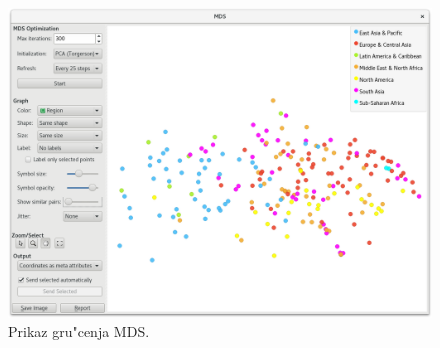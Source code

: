 \begin{figure}
\begin{center}
\includegraphics[width=12cm]{pic/clustering_mds.png}
\end{center}
\caption{Prikaz gru"cenja MDS.}
\label{clustering_mds}
\end{figure} 

